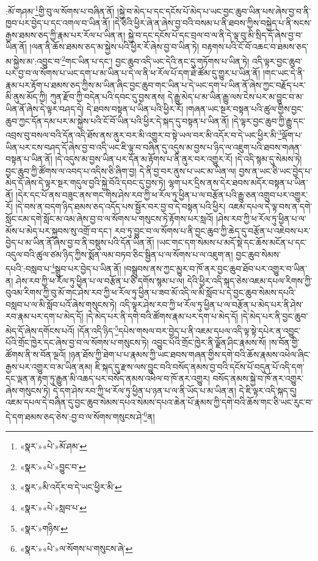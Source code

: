 :མོ་གཤམ་\footnote{«སྣར་»«པེ་»མོ་ཤམ་}གྱི་བུ་ལ་སོགས་པ་བཞིན་ནོ། །སྐྱེ་བ་མེད་པ་དང་དངོས་པོ་མེད་པ་ཡང་བྱང་ཆུབ་ཡིན་པས་ཞེས་བྱ་བ་ནི་ཁྱབ་པར་བྱེད་པ་དང་འགལ་བ་ཡིན་ནོ། །དེ་ཅིའི་ཕྱིར་ཞེ་ན་ཞེས་བྱ་བའི་བསམ་པ་ནི་ཐབས་ཀྱིས་བསྐྱེད་པ་ནི་སངས་རྒྱས་ཐམས་ཅད་ཀྱི་རྣམ་པར་རོལ་པ་ཡིན་ན། སྐྱེ་བ་དང་དངོས་པོ་དང་བྲལ་བ་ལ་ནི་དེ་ལྟ་བུ་མི་སྲིད་དོ་ཞེས་བྱ་བ་ཡིན་ནོ། །ལན་ནི་ཆོས་ཐམས་ཅད་མ་སྐྱེས་པའི་ཕྱིར་རོ་ཞེས་བྱ་བ་ཡིན་ཏེ། བརྟགས་པའི་ངོ་བོ་འཆང་བ་ཐམས་ཅད་མ་སྐྱེས་མ་:འབྱུང་བ་\footnote{«སྣར་»«པེ་»བྱུང་བ་}གང་ཡིན་པ་དང་། བྱང་ཆུབ་འདི་ཡང་དེའི་ནང་དུ་གཏོགས་པ་ཡིན་ཏེ། འདི་ལྟར་བྱང་ཆུབ་པར་བྱ་བ་ལ་སོགས་པ་ཡང་དག་པ་མ་ཡིན་པ་དེ་ལ་ནི་ཕ་རོལ་པོ་དག་ཐེ་ཚོམ་དུ་གྱུར་པ་ཡིན་ནོ། །གང་ཡང་དེ་ནི་རྣམ་པར་རྟོག་པ་ཐམས་ཅད་ཀྱིས་མ་ཡིན་ཞིང་བྱང་ཆུབ་གང་ཡིན་པ་དེ་ཡང་དག་པ་ཡིན་ནོ་ཞེས་ཀྱང་བརྗོད་པར་མི་ནུས་མོད་ཀྱི། ཀུན་རྫོབ་ཀྱི་བདེན་པའི་དབང་དུ་བྱས་ནས། དེ་རྒྱུ་མེད་པ་མ་ཡིན་རྒྱུ་ལས་ངེས་པར་མ་བྱུང་བ་མ་ཡིན་ནོ་ཞེས་དེ་ལྟར་བཤད་དེ། དེ་ཐབས་བསྟན་པ་ཡིན་པའི་ཕྱིར་རོ། །གཞན་ཡང་སྔར་བསྟན་པའི་ཚུལ་གྱིས་བྱང་ཆུབ་ཀྱང་དོན་དམ་པར་མ་སྐྱེས་པའི་ངོ་བོ་ཡིན་པའི་ཕྱིར་དེ་སྐད་དུ་བསྟན་པ་ཡིན་ནོ། །དེ་ལྟར་བྱང་ཆུབ་ཀྱི་རྒྱུ་དང་འབྲས་བུ་བསལ་བའི་དོན་འདི་ཐོས་ནས་ནུར་བར་མི་འགྱུར་བ་སྟེ་ཡལ་བར་མི་འདོར་བ་དེ་ཡང་ཕྱིར་མི་\footnote{«སྣར་»མི་འདོར་བ་དེ་ཡང་ཕྱིར་མི་}ལྡོག་པ་ཡིན་པར་ངས་བཤད་དོ་ཞེས་བྱ་བ་འདི་ཡང་ཇི་ལྟ་བ་བཞིན་དུ་འདུས་མ་བྱས་པ་ཉིད་ལ་འཇུག་པའི་ཐབས་གཞན་བསྟན་པ་ཡིན་ནོ། །དེ་འདུས་མ་བྱས་ཡིན་པར་དོན་མ་རྟོགས་པ་ནི་ནུར་བར་འགྱུར་རོ། །དེ་འདི་སྙམ་དུ་སེམས་ཏེ། བྱང་ཆུབ་ཀྱི་ཚོགས་ལ་འབད་པ་འདིས་ཅི་ཞིག་བྱ། དེ་ནི་བྱ་བར་ནུས་པ་ཡང་མ་ཡིན་ལ། བྱས་ན་ཡང་ཅི་ཡང་བྱེད་པ་མེད་དོ་ཞེས་དེ་ལྟར་སྔར་གདུལ་བྱའི་སྐྱེ་བོའི་དབང་དུ་བྱས་ཏེ། ལྷག་པར་དྲིས་ནས་དེར་ཐབས་མདོར་བསྟན་པ་ཡིན་ནོ། །དེར་དང་པོ་ནས་བཟུང་ནས་གང་གིས་ཤེས་རབ་ཀྱི་ཕ་རོལ་ཏུ་ཕྱིན་པ་ལ་བརྩོན་པའི་རྒྱུ་ཅན་འགྲུབ་པར་འགྱུར་རོ། །དེ་བས་ན་བདག་ཉིད་ཐམས་ཅད་འདོད་པས་སྦྱོར་བར་བྱ་བ་དེ་བསྟན་པའི་ཕྱིར། འཇམ་དཔལ་དེ་ལྟ་བས་ན་དགེ་སློང་ངམ་དགེ་སློང་མ་འམ་ཞེས་བྱ་བ་ལ་སོགས་པ་གསུངས་ཏེ་རྟོགས་པར་སླའོ། །ཤེས་རབ་ཀྱི་ཕ་རོལ་ཏུ་ཕྱིན་པ་ལ་མོས་པ་མེད་པར་སྐྱབས་སུ་འགྲོ་བ་དང་། རབ་ཏུ་བྱུང་བ་ལ་སོགས་པ་ནི་བྱང་ཆུབ་ཀྱི་ཆེད་དུ་བརྩོན་པ་འཇེབས་པར་བྱེད་པ་མ་ཡིན་ནོ་ཞེས་བྱ་བ་ནི་བསྡུས་པའི་དོན་ཡིན་ནོ། །ཡང་གང་དག་སེམས་པ་མདོ་སྡེ་དང་ཆོས་མངོན་པ་དང་འདུལ་བའི་ཚུལ་ཙམ་ཉིད་ཀྱིས་སྨོན་ལམ་བཏབ་ཅིང་སྦྱིན་པ་ལ་སོགས་པ་ལ་འཇུག་ན། བྱང་ཆུབ་སེམས་དཔའི་:བསླབ་པ་\footnote{«སྣར་»«པེ་»སླབ་པ་}སྒྲུབ་པར་བྱེད་པ་ཡིན་ནོ། །བསྒྲུབས་ནས་ཀྱང་མྱུར་བ་ཁོ་ནར་བྱང་ཆུབ་ཐོབ་པར་འགྱུར་བ་ཡིན་ན། ཤེས་རབ་ཀྱི་ཕ་རོལ་ཏུ་ཕྱིན་པ་ལ་བརྩོན་པ་ཅི་དགོས་སྙམ་པ་ལ། དེའི་ཕྱིར་འདི་སྐད་ཅེས་འཇམ་དཔལ་རིགས་ཀྱི་བུའམ་རིགས་ཀྱི་བུ་མོ་གང་ཤེས་རབ་ཀྱི་ཕ་རོལ་ཏུ་ཕྱིན་པ་ཟབ་མོ་འདི་ལ་མི་སློབ་པ་དེ་བྱང་ཆུབ་སེམས་དཔའི་བསླབ་པ་ལ་མི་སློབ་པའོ་ཞེས་གསུངས་ཏེ། འདི་ལྟར་ཤེས་རབ་ཀྱི་ཕ་རོལ་ཏུ་ཕྱིན་པ་ལ་བརྩོན་པ་མེད་པར་ནི་ཤེས་རབ་རྣམ་པར་དག་པ་མེད་དོ། །དེ་མེད་པར་ནི་དགེ་བའི་ཚོགས་རྣམ་པར་དག་པ་མེད་དོ། །དེ་མེད་པར་ནི་བྱང་ཆུབ་མེད་དོ་ཞེས་དགོངས་པའོ། །དོན་འདི་ཉིད་\footnote{«སྣར་»གཉིས་}དཔེས་གསལ་བར་བྱེད་པ་ནི་འཇམ་དཔལ་འདི་ལྟ་སྟེ་དཔེར་ན་འབྱུང་པོའི་གྲོང་ཁྱེར་དང་ཞེས་བྱ་བ་ལ་སོགས་པ་གསུངས་ཏེ། འབྱུང་པོའི་གྲོང་ཁྱེར་ནི་ལྗོན་ཤིང་རྣམས་སོ། །ས་བོན་གྱི་ཚོགས་ནི་ས་བོན་ལྔའོ། །ཉན་ཐོས་ཀྱི་ཐེག་པ་པ་རྣམས་ཀྱི་ཡང་ཐབས་གཞན་གྱིས་དགེ་བའི་ཆོས་རྣམས་འཕེལ་ཞིང་རྒྱས་པར་འགྱུར་བ་མ་ཡིན་ནམ། ཇི་སྐད་དུ་རྫས་ལས་བྱུང་བའི་བསོད་ནམས་བྱ་བའི་དངོས་པོ་བདུན་པོ་འདི་དག་དང་ལྡན་ན་རྟག་ཏུ་རྒྱུན་མི་འཆད་པར་བསོད་ནམས་འཕེལ་བ་ཁོ་ནར་འགྱུར། བསོད་ནམས་སྐྱེ་བ་ཁོ་ནར་འགྱུར་ཞེས་གསུངས་ཏེ། དེ་དག་ཤེས་རབ་ཀྱི་ཕ་རོལ་ཏུ་ཕྱིན་པ་ཉན་པ་ལ་ནི་ཡོད་པ་མ་ཡིན་ན། དེ་ཇི་ལྟར་འདི་སྐད་དུ། འཇམ་དཔལ་དེ་བཞིན་དུ་བྱང་ཆུབ་སེམས་དཔའ་སེམས་དཔའ་ཆེན་པོ་རྣམས་ཀྱི་དགེ་བའི་ཆོས་གང་ཅི་ཡང་རུང་བ་དེ་དག་ཐམས་ཅད་ཅེས་:བྱ་བ་ལ་སོགས་གསུངས་ཤེ་\footnote{«སྣར་»«པེ་»ལ་སོགས་པ་གསུངས་ཞེ་}ན། 
